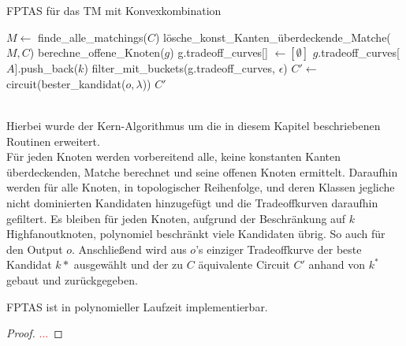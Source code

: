 \documentclass[11pt, a4paper, german]{article}
\begin{document}
\LinesNumbered
\begin{algorithm}[H]
\DontPrintSemicolon
\caption{FPTAS f\"ur das TM mit Konvexkombination}

   $M \gets$ finde\_alle\_matchings($C$)\;
   lösche\_konst\_Kanten\_überdeckende\_Matche($M, C$)\;
        {
			berechne\_offene\_Knoten($g$)\;	 
        }
  {
    g.tradeoff\_curves[] $\gets [\emptyset]$\;
    {
      {
        {
        	 {
			$g$.tradeoff\_curves[$A$].push\_back($k$)\;      	 
        	 }  
        }
      }
    }
    filter\_mit\_buckets(g.tradeoff\_curves, $\epsilon$)\;
  }
  $C' \gets $ circuit(bester\_kandidat($o, \lambda$))\;
  \Return $C'$\;
\end{algorithm}\ \\

Hierbei wurde der Kern-Algorithmus um die in diesem Kapitel beschriebenen Routinen erweitert. \\
Für jeden Knoten werden vorbereitend alle, keine konstanten Kanten überdeckenden, Matche berechnet und seine offenen Knoten ermittelt. Daraufhin werden für alle Knoten, in topologischer Reihenfolge, und deren Klassen  jegliche nicht dominierten Kandidaten hinzugefügt und die Tradeoffkurven daraufhin gefiltert. Es bleiben für jeden Knoten, aufgrund der Beschränkung auf $k$ Highfanoutknoten, polynomiel beschränkt viele Kandidaten übrig. So auch für den Output $o$. Anschließend wird aus $o$'s einziger Tradeoffkurve der beste Kandidat $k*$ ausgewählt und der zu $C$ äquivalente Circuit $C'$ anhand von $k^*$ gebaut und zurückgegeben.

\begin{lemma}
	FPTAS ist in polynomieller Laufzeit implementierbar.
\end{lemma}
\begin{proof}
\textcolor{red}{...}
\end{proof}
\end{document}
